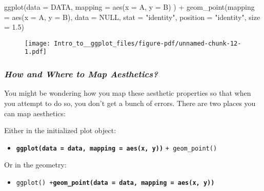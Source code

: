 \documentclass[
  letterpaper,
  DIV=11,
  numbers=noendperiod]{scrartcl}
\newenvironment{Shaded}{\begin{snugshade}}{\end{snugshade}}
\newcommand{\AttributeTok}[1]{\textcolor[rgb]{0.40,0.45,0.13}{#1}}
\newcommand{\ConstantTok}[1]{\textcolor[rgb]{0.56,0.35,0.01}{#1}}
\newcommand{\FloatTok}[1]{\textcolor[rgb]{0.68,0.00,0.00}{#1}}
\newcommand{\FunctionTok}[1]{\textcolor[rgb]{0.28,0.35,0.67}{#1}}
\newcommand{\NormalTok}[1]{\textcolor[rgb]{0.00,0.23,0.31}{#1}}
\newcommand{\SpecialCharTok}[1]{\textcolor[rgb]{0.37,0.37,0.37}{#1}}
\newcommand{\StringTok}[1]{\textcolor[rgb]{0.13,0.47,0.30}{#1}}
\providecommand{\tightlist}{%
  \setlength{\itemsep}{0pt}\setlength{\parskip}{0pt}}\usepackage{longtable,booktabs,array}
\begin{document}
\begin{Shaded}
\begin{Highlighting}[]
\FunctionTok{ggplot}\NormalTok{(}\AttributeTok{data =}\NormalTok{ DATA, }
       \AttributeTok{mapping =} \FunctionTok{aes}\NormalTok{(}\AttributeTok{x =}\NormalTok{ A, }\AttributeTok{y =}\NormalTok{ B)}
\NormalTok{       ) }\SpecialCharTok{+}
  \FunctionTok{geom\_point}\NormalTok{(}\AttributeTok{mapping =} \FunctionTok{aes}\NormalTok{(}\AttributeTok{x =}\NormalTok{ A, }\AttributeTok{y =}\NormalTok{ B),   }
             \AttributeTok{data =} \ConstantTok{NULL}\NormalTok{, }
             \AttributeTok{stat =} \StringTok{"identity"}\NormalTok{, }
             \AttributeTok{position =} \StringTok{"identity"}\NormalTok{, }
             \AttributeTok{size =} \FloatTok{1.5}\NormalTok{)}
\end{Highlighting}
\end{Shaded}

\begin{figure}[H]

{\centering \texttt{[image: Intro\_to\_\_ggplot\_files/figure-pdf/unnamed-chunk-12-1.pdf]}

}

\end{figure}

\hypertarget{how-and-where-to-map-aesthetics}{%
\subsubsection{\texorpdfstring{\emph{How and Where to Map
Aesthetics?}}{How and Where to Map Aesthetics?}}\label{how-and-where-to-map-aesthetics}}

You might be wondering how you map these aesthetic properties so that
when you attempt to do so, you don't get a bunch of errors. There are
two places you can map aesthetics:

Either in the initialized plot object:

\begin{itemize}
\tightlist
\item
  \textbf{\texttt{ggplot(data\ =\ data,\ mapping\ =\ aes(x,\ y))}}
  \texttt{+\ geom\_point()}
\end{itemize}

Or in the geometry:

\begin{itemize}
\tightlist
\item
  \texttt{ggplot()\ +}\textbf{\texttt{geom\_point(data\ =\ data,\ mapping\ =\ aes(x,\ y))}}
\end{itemize}
\end{document}
